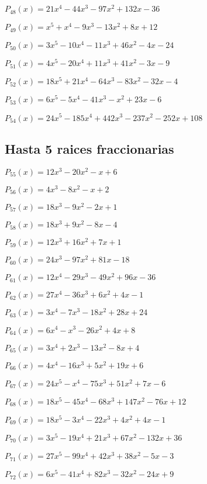 \subitem $P_{48}(x) = 21x^4 - 44x^3 - 97x^2 + 132x - 36$


\subitem $P_{49}(x) = x^5 + x^4 - 9x^3 - 13x^2 + 8x + 12$

\subitem $P_{50}(x) = 3x^5 - 10x^4 - 11x^3 + 46x^2 - 4x - 24$

\subitem $P_{51}(x) = 4x^5 - 20x^4 + 11x^3 + 41x^2 - 3x - 9$

\subitem $P_{52}(x) = 18x^5 + 21x^4 - 64x^3 - 83x^2 - 32x - 4$

\subitem $P_{53}(x) = 6x^5 - 5x^4 - 41x^3 - x^2 + 23x - 6$

\subitem $P_{54}(x) = 24x^5 - 185x^4 + 442x^3 - 237x^2 - 252x + 108$

\subsection{Hasta 5 raices fraccionarias}

\subitem $P_{55}(x) = 12x^3 - 20x^2 - x + 6$

\subitem $P_{56}(x) = 4x^3 - 8x^2 - x + 2$

\subitem $P_{57}(x) = 18x^3 - 9x^2 - 2x + 1$

\subitem $P_{58}(x) = 18x^3 + 9x^2 - 8x - 4$

\subitem $P_{59}(x) = 12x^3 + 16x^2 + 7x + 1$

\subitem $P_{60}(x) = 24x^3 - 97x^2 + 81x - 18$


\subitem $P_{61}(x) = 12x^4 - 29x^3 - 49x^2 + 96x - 36$

\subitem $P_{62}(x) = 27x^4 - 36x^3 + 6x^2 + 4x - 1$

\subitem $P_{63}(x) = 3x^4 - 7x^3 - 18x^2 + 28x + 24$

\subitem $P_{64}(x) = 6x^4 - x^3 - 26x^2 + 4x + 8$

\subitem $P_{65}(x) = 3x^4 + 2x^3 - 13x^2 - 8x + 4$

\subitem $P_{66}(x) = 4x^4 - 16x^3 + 5x^2 + 19x + 6$


\subitem $P_{67}(x) = 24x^5 - x^4 - 75x^3 + 51x^2 + 7x - 6$

\subitem $P_{68}(x) = 18x^5 - 45x^4 - 68x^3 + 147x^2 - 76x + 12$

\subitem $P_{69}(x) = 18x^5 - 3x^4 - 22x^3 + 4x^2 + 4x - 1$

\subitem $P_{70}(x) = 3x^5 - 19x^4 + 21x^3 + 67x^2 - 132x + 36$

\subitem $P_{71}(x) = 27x^5 - 99x^4 + 42x^3 + 38x^2 - 5x - 3$

\subitem $P_{72}(x) = 6x^5 - 41x^4 + 82x^3 - 32x^2 - 24x + 9$

